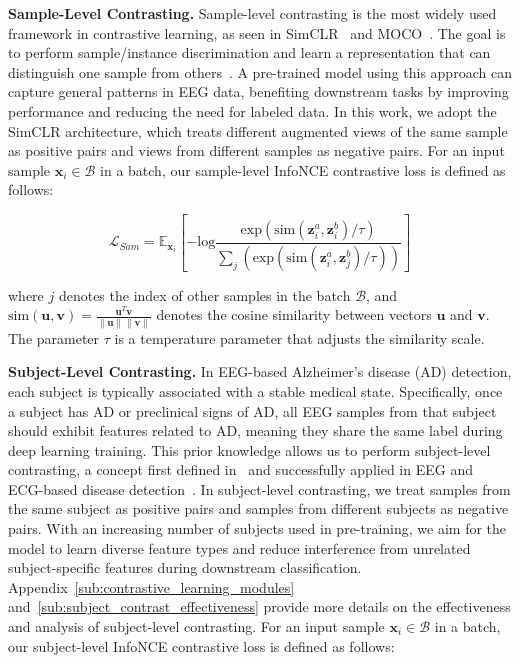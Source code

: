 \textbf{Sample-Level Contrasting.} Sample-level contrasting is the most widely used framework in contrastive learning, as seen in SimCLR~\cite{chen2020simple} and MOCO~\cite{he2020momentum}. The goal is to perform sample/instance discrimination and learn a representation that can distinguish one sample from others~\cite{wu2018unsupervised}. A pre-trained model using this approach can capture general patterns in EEG data, benefiting downstream tasks by improving performance and reducing the need for labeled data. In this work, we adopt the SimCLR architecture, which treats different augmented views of the same sample as positive pairs and views from different samples as negative pairs. For an input sample $\bm{x}_i \in \mathcal{B}$ in a batch, our sample-level InfoNCE contrastive loss is defined as follows:

\begin{equation}
\label{eq:sample_loss}
\mathcal{L}_{Sam} = 
\mathbb{E}_{\bm{x}_i}
    \left[
    -\textrm{log}
        \frac
            {\textrm{exp}( \textrm{sim}( \bm{z}_i^a, \bm{z}_i^b ) / \tau)}
            {
            \sum_{j}
                \left(
                \textrm{exp}( \textrm{sim}( \bm{z}_i^a, \bm{z}_j^b ) / \tau)
                \right)
            }
    \right]
\end{equation}

where $j$ denotes the index of other samples in the batch $\mathcal{B}$, and $\textrm{sim} (\bm{u}, \bm{v}) = \frac{\bm{u}^T \bm{v}}{\|\bm{u}\| \|\bm{v}\|}$ denotes the cosine similarity between vectors $\bm{u}$ and $\bm{v}$. The parameter $\tau$ is a temperature parameter that adjusts the similarity scale. 




\textbf{Subject-Level Contrasting.} In EEG-based Alzheimer’s disease (AD) detection, each subject is typically associated with a stable medical state. Specifically, once a subject has AD or preclinical signs of AD, all EEG samples from that subject should exhibit features related to AD, meaning they share the same label during deep learning training. This prior knowledge allows us to perform subject-level contrasting, a concept first defined in~\cite{wang2024contrast} and successfully applied in EEG and ECG-based disease detection~\cite{kiyasseh2021clocs, wang2024contrast, abbaspourazad2023large}. In subject-level contrasting, we treat samples from the same subject as positive pairs and samples from different subjects as negative pairs. With an increasing number of subjects used in pre-training, we aim for the model to learn diverse feature types and reduce interference from unrelated subject-specific features during downstream classification. Appendix~\ref{sub:contrastive_learning_modules} and~\ref{sub:subject_contrast_effectiveness} provide more details on the effectiveness and analysis of subject-level contrasting. For an input sample $\bm{x}_i \in \mathcal{B}$ in a batch, our subject-level InfoNCE contrastive loss is defined as follows:

